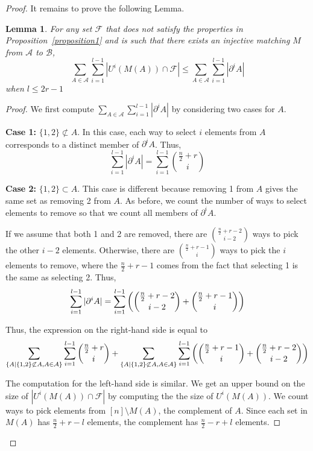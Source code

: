 \documentclass[12pt]{article}
\theoremstyle{plain}
\newtheorem{lemma}[theorem]{Lemma}
\theoremstyle{definition}
\theoremstyle{remark}
\newcommand{\F}{\mathcal{F}}
\newcommand{\A}{\mathcal{A}}
\newcommand{\B}{\mathcal{B}}
\begin{document}
\begin{proof}

It remains to prove the following Lemma.

\begin{lemma} For any set $\F$ that does not satisfy the properties in Proposition~\ref{proposition1} and is such that there exists an injective matching $M$ from $\A$ to $\B$,
\label{lemma1}
\[ \sum_{A\in \A}\sum_{i = 1}^{l-1} |U^i(M(A)) \cap \F| \leq \sum_{A \in \A}\sum_{i = 1}^{l-1} |\partial^i A | \]
when $l \leq 2r-1$
\end{lemma}

\begin{proof} We first compute $\sum_{A \in \A}\sum_{i = 1}^{l-1} |\partial^i A |$ by considering two cases for $A$.

\textbf{Case 1:} $\{1,2\} \not\subset A$. In this case, each way to select $i$ elements from $A$ corresponds to a distinct member of $\partial^i A$. Thus,
\[ \sum_{i=1}^{l-1} |\partial^i A| = \sum_{i=1}^{l-1}\binom{\frac{n}{2}+r}{i} \]

\textbf{Case 2:} $\{1,2\} \subset A$. This case is different because removing 1 from $A$ gives the same set as removing 2 from $A$. As before, we count the number of ways to select elements to remove so that we count all members of $\partial^i A$.

If we assume that both 1 and 2 are removed, there are $\binom{\frac{n}{2} + r - 2}{i-2}$ ways to pick the other $i-2$ elements. Otherwise, there are $\binom{\frac{n}{2}+r-1}{i}$ ways to pick the $i$ elements to remove, where the $\frac{n}{2} + r - 1$ comes from the fact that selecting 1 is the same as selecting 2. Thus, 
\[ \sum_{i=1}^{l-1} |\partial^i A| = \sum_{i=1}^{l-1} \left( \dbinom{\frac{n}{2}+r-2}{i-2} + \dbinom{\frac{n}{2} + r - 1}{i}\right)\]

Thus, the expression on the right-hand side is equal to
\[ \sum_{\{A | \{1, 2\} \not\subset A, A \in \A\}} \sum_{i=1}^{l-1} \dbinom{\frac{n}{2} + r}{i} + \sum_{\{A | \{1, 2\} \not\subset A, A \in \A\}} \sum_{i=1}^{l-1} \left( \dbinom{\frac{n}{2}+r-1}{i} + \dbinom{\frac{n}{2}+r-2}{i-2}\right) \]

The computation for the left-hand side is similar. We get an upper bound on the size of $|U^i(M(A)) \cap \F|$ by computing the the size of $U^i(M(A))$. We count ways to pick elements from $[n] \setminus M(A)$, the complement of $A$. Since each set in $M(A)$ has $\frac{n}{2} + r - l$ elements, the complement has $\frac{n}{2} - r + l$ elements. 


\end{proof}
\end{proof}
\end{document}
